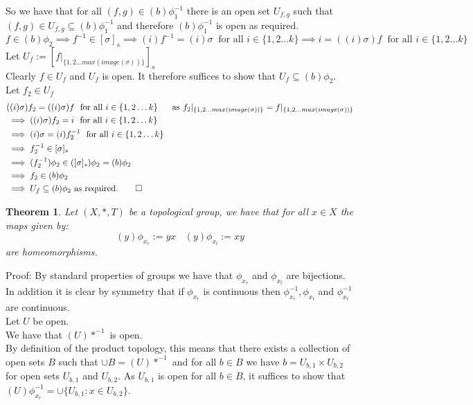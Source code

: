 \documentclass{report}
\newtheorem{theorem}{Theorem}[section]
\begin{document}
So we have that for all $(f,g)\in (b)\phi_1^{-1}$ there is an open set $U_{f,g}$ such that $(f,g)\in U_{f,g}\subseteq (b)\phi_1^{-1}$ and therefore $(b)\phi_1^{-1}$ is open as required.
\[f \in (b)\phi_2 \implies f^{-1} \in [\sigma]_s \implies (i)f^{-1}=(i)\sigma \ \text{ for all } i \in \{1,2\ldots k\} \implies i=((i)\sigma)f \ \text{ for all } i \in \{1,2 \ldots k\}\]
Let $U_f := [f\vert_{\{1,2 \ldots max(image(\sigma))\}}]_s$\\
Clearly $f\in U_f$ and $U_f$ is open.
It therefore suffices to show that $U_f\subseteq (b)\phi_2$.\\
Let $f_2\in U_f$\\
\begin{align*}
&((i)\sigma)f_2 = ((i)\sigma)f\ \text{ for all } i \in \{1,2 \ldots k\}\ \ \ \  \text{      as }f_2\vert_{\{1,2 \ldots max(image(\sigma))\}}=f\vert_{\{1,2 \ldots max(image(\sigma))\}}\\
&\implies ((i)\sigma)f_2 = i\ \text{ for all } i \in \{1,2 \ldots k\}\\
&\implies (i)\sigma = (i)f_2^{-1}\ \text{ for all } i \in \{1,2 \ldots k\}\\
&\implies f_2^{-1}\in [\sigma]_s\\
&\implies (f_2^{-1})\phi_2 \in ([\sigma]_s)\phi_2=(b)\phi_2\\
&\implies f_2 \in (b)\phi_2\\
&\implies U_{f}\subseteq (b)\phi_2 \text{ as required.}\qed
\end{align*}
\begin{theorem}\label{homeomorphic multiplication}
Let $(X,*,T)$ be a topological group, we have that for all $x \in X$ the maps given by:
\[(y)\phi_{x_r}:=yx \ \ \ \ (y)\phi_{x_l}:=xy\]
are homeomorphisms.
\end{theorem}\par
Proof: By standard properties of groups we have that $\phi_{x_r}$ and $\phi_{x_l}$ are bijections. In addition it is clear by symmetry that if $\phi_{x_r}$ is continuous then $\phi_{x_r}^{-1}, \phi_{x_l}$ and $\phi_{x_l}^{-1}$ are continuous.\\
Let $U$ be open.\\
We have that $(U)*^{-1}$ is open.\\
By definition of the product topology, this means that there exists a collection of open sets $B$ such that $\cup B = (U)*^{-1}$ and for all $b \in B$  we have $b=U_{b,1}\times U_{b,2}$ for open sets  $U_{b,1}$ and $U_{b,2}$. As $U_{b,1}$ is open for all $b \in B$, it suffices to show that $(U)\phi_{x_r}^{-1}=\cup\{U_{b,1}:x \in U_{b,2}\}$.
\end{document}

